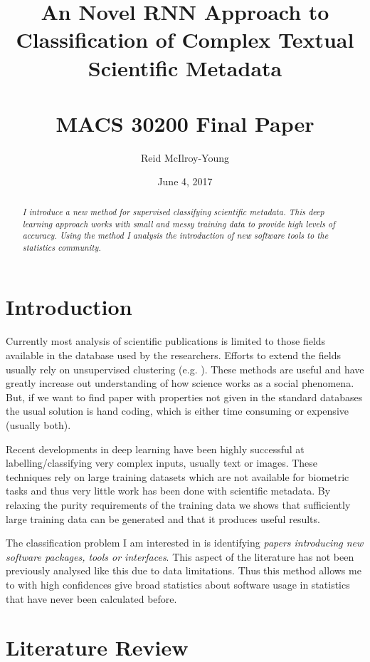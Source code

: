 \documentclass[12pt, a4paper]{article}
\author{Reid McIlroy-Young}
\title{An Novel RNN Approach to Classification of Complex Textual Scientific Metadata \\ \quad \\ \large MACS 30200 Final Paper}
\date{June 4, 2017}
\begin{document}
\maketitle
\begin{abstract}
	\thispagestyle{plain}
	\textit{
		I introduce a new method for supervised classifying scientific metadata. This deep learning approach works with small and messy training data to provide high levels of accuracy. Using the method I analysis the introduction of new software tools to the statistics community.
	}
\end{abstract}		
\newpage
\tableofcontents
\newpage
\listoffigures
\newpage
\listoftables

\newpage
\setcounter{page}{1}

\section{Introduction}

Currently most analysis of scientific publications is limited to those fields available in the database used by the researchers. Efforts to extend the fields usually rely on unsupervised clustering (e.g. \cite{Boyack2005}). These methods are useful and have greatly increase out understanding of how science works as a social phenomena. But, if we want to find paper with properties not given in the standard databases the usual solution is hand coding, which is either time consuming or expensive (usually both).

Recent developments in deep learning \citep{karpathy2015deep} have been highly successful at labelling/classifying very complex inputs, usually text or images. These techniques rely on large training datasets which are not available for biometric tasks and thus very little work has been done with scientific metadata. By relaxing the purity requirements of the training data we shows that sufficiently large training data can be generated and that it produces useful results.

The classification problem I am interested in is identifying \textit{papers introducing new software packages, tools or interfaces}. This aspect of the literature has not been previously analysed like this due to data limitations. Thus this method allows me to with high confidences give broad statistics about software usage in statistics that have never been calculated before.


\section{Literature Review}
\end{document}
